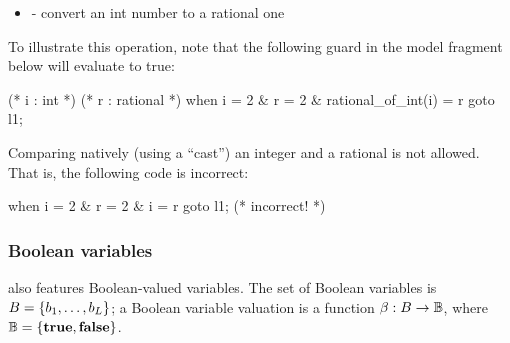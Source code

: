 \begin{itemize}
    \item \label{item:lbl-rational_of_int}  - convert an int number to a rational one
\end{itemize}

\begin{example}
	To illustrate this operation, note that the following guard in the model fragment below will evaluate to true:

	\begin{IMITATORmodel}
		(* i : int *)
		(* r : rational *)
		when i = 2 & r = 2 & rational_of_int(i) = r goto l1;
	\end{IMITATORmodel}
\end{example}

\begin{remark}
	Comparing natively (using a ``cast'') an integer and a rational is not allowed.
	That is, the following code is incorrect:
	
		\begin{IMITATORmodel}
			when i = 2 & r = 2 & i = r goto l1; (* incorrect! *)
		\end{IMITATORmodel}
\end{remark}


\subsubsection{Boolean variables}

\imitator{} also features Boolean-valued variables.
The set of Boolean variables is $B = \{ b_1, \dots, b_L \} $;
a Boolean variable valuation is a function $\beta : B \rightarrow \mathbb B$, where $\mathbb B = \{\mathbf{true}, \mathbf{false} \}$.

